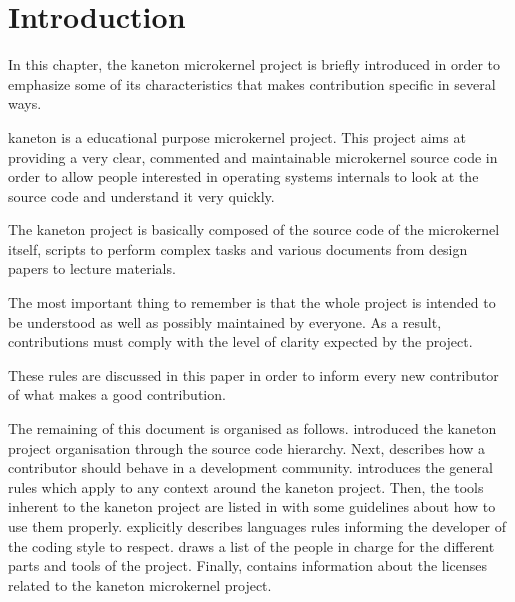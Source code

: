 %
%
%
%
%
%

%
%

\chapter{Introduction}
\label{chapter:environment}

In this chapter, the kaneton microkernel project is briefly introduced
in order to emphasize some of its characteristics that makes contribution
specific in several ways.

\newpage

%
%

kaneton is a educational purpose microkernel project. This project aims
at providing a very clear, commented and maintainable microkernel source
code in order to allow people interested in operating systems internals
to look at the source code and understand it very quickly.

The kaneton project is basically composed of the source code of the
microkernel itself, scripts to perform complex tasks and various documents
from design papers to lecture materials.

The most important thing to remember is that the whole project is intended
to be understood as well as possibly maintained by everyone. As a result,
contributions must comply with the level of clarity expected by the project.

These rules are discussed in this paper in order to inform every new
contributor of what makes a good contribution.

The remaining of this document is organised as follows.
 introduced the kaneton project
organisation through the source code hierarchy. Next,  describes how a contributor should behave in a
development community.  introduces the
general rules which apply to any context around the kaneton project. Then,
the tools inherent to the kaneton project are listed in  with some guidelines about how to use them properly.
 explicitly describes languages
rules informing the developer of the coding style to respect.
 draws a list of the people in charge
for the different parts and tools of the project. Finally,  contains information about the licenses related to
the kaneton microkernel project.
